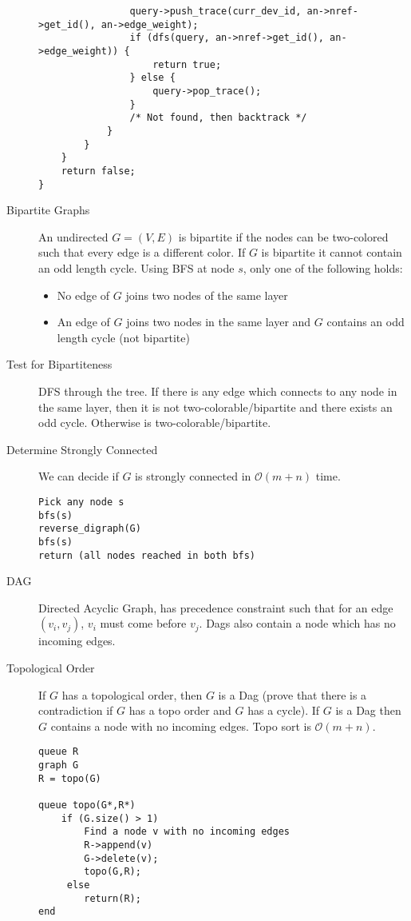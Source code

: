 \documentclass[8pt]{article}
\begin{document}
\begin{multicols}{2}
\begin{description}
{\begin{verbatim}
                query->push_trace(curr_dev_id, an->nref->get_id(), an->edge_weight);
                if (dfs(query, an->nref->get_id(), an->edge_weight)) {
                    return true;
                } else {
                    query->pop_trace();
                }
                /* Not found, then backtrack */
            }
        }
    }
    return false;
}
\end{verbatim}
    }
  \item[Bipartite Graphs] An undirected $G=(V,E)$ is bipartite if the
    nodes can be two-colored such that every edge is a different
    color. If $G$ is bipartite it cannot contain an odd length
    cycle. Using BFS at node $s$, only one of the following holds:
    \begin{itemize}
    \item No edge of $G$ joins two nodes of the same layer
    \item An edge of $G$ joins two nodes in the same layer and $G$
      contains an odd length cycle (not bipartite)
    \end{itemize}
  \item[Test for Bipartiteness] DFS through the tree. If there is any
    edge which connects to any node in the same layer, then it is not
    two-colorable/bipartite and there exists an odd cycle. Otherwise
    is two-colorable/bipartite.
  \item[Determine Strongly Connected] We can decide if $G$ is strongly
    connected in $\mathcal{O}(m+n)$ time.
    { \footnotesize
\begin{verbatim}
Pick any node s
bfs(s)
reverse_digraph(G)
bfs(s)
return (all nodes reached in both bfs)
\end{verbatim}
    }
  \item[DAG] Directed Acyclic Graph, has precedence constraint such that
    for an edge $(v_i,v_j)$, $v_i$ must come before $v_j$. Dags also
    contain a node which has no incoming edges.
  \item[Topological Order] If $G$ has a topological order, then $G$ is
    a Dag (prove that there is a contradiction if $G$ has a topo order
    and $G$ has a cycle). If $G$ is a Dag then $G$ contains a node
    with no incoming edges. Topo sort is $\mathcal{O}(m+n)$.
\begin{verbatim}
queue R
graph G
R = topo(G)

queue topo(G*,R*)
    if (G.size() > 1)
        Find a node v with no incoming edges
        R->append(v)
        G->delete(v);
        topo(G,R);
     else
        return(R);
end
\end{verbatim}
  \end{description} %
\end{multicols}
\end{document}
